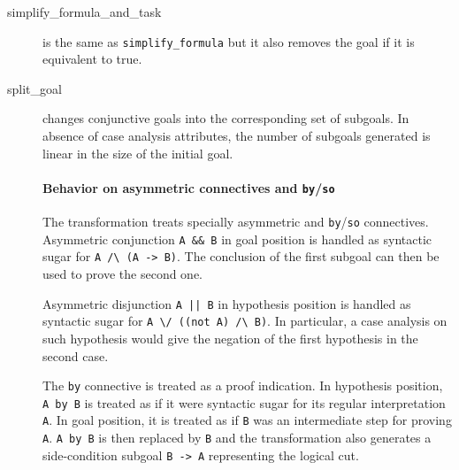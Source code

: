 \begin{description}

\item[simplify\_formula\_and\_task] is the same as \texttt{simplify\_formula}
  but it also removes the goal if it is equivalent to true.

\item[split\_goal] changes conjunctive goals into the
  corresponding set of subgoals. In absence of case analysis attributes,
  the number of subgoals generated is linear in the size of the initial goal.

  \paragraph{Behavior on asymmetric connectives and
    \texttt{by}/\texttt{so}}

  The transformation treats specially asymmetric and
  \texttt{by}/\texttt{so} connectives. Asymmetric conjunction
  \verb|A && B| in goal position is handled as syntactic sugar for
  \verb|A /\ (A -> B)|.  The conclusion of the first subgoal can then
  be used to prove the second one.

  Asymmetric disjunction \verb+A || B+ in hypothesis position is handled as
  syntactic sugar for \verb|A \/ ((not A) /\ B)|.
  In particular, a case analysis on such hypothesis would give the negation of
  the first hypothesis in the second case.

  The \texttt{by} connective is treated as a proof indication. In
  hypothesis position, \verb|A by B| is treated as if it were
  syntactic sugar for its regular interpretation \verb|A|. In goal
  position, it is treated as if \verb|B| was an intermediate step for
  proving \verb|A|. \verb|A by B| is then replaced by \verb|B| and the
  transformation also generates a side-condition subgoal \verb|B -> A|
  representing the logical cut.


\end{description}
